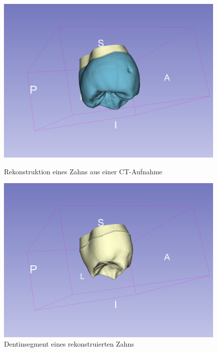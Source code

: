 \begin{figure}[h]
	\centering
	\begin{minipage}[b]{0.32\textwidth}
		\centering
		\includegraphics[width=\textwidth]{img/3dView.png}
		\caption{Rekonstruktion eines Zahns aus einer CT-Aufnahme}
		\label{fig:3d_view}
	\end{minipage}
	\hfill
	\begin{minipage}[b]{0.32\textwidth}
		\centering
		\includegraphics[width=\textwidth]{img/3dViewDentin.png}
		\caption{Dentinsegment eines rekonstruierten Zahns}
		\label{fig:3d_view_dentin}
	\end{minipage}
	\hfill
	\begin{minipage}[b]{0.32\textwidth}
		\centering

\end{minipage}
\end{figure}
